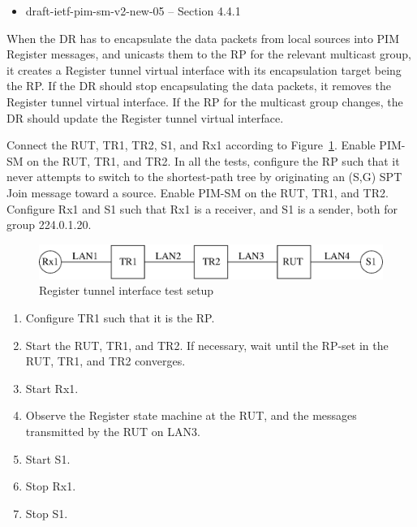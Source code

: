 \documentclass[11pt]{report}
\begin{document}
\begin{itemize}
  \item draft-ietf-pim-sm-v2-new-05 -- Section 4.4.1
\end{itemize}

When the DR has to encapsulate the data packets from local sources into
PIM Register messages, and unicasts them to the RP for the relevant multicast
group, it creates a Register tunnel virtual interface with its encapsulation
target being the RP. If the DR should stop encapsulating the data packets, it
removes the Register tunnel virtual interface. If the RP for the multicast
group changes, the DR should update the Register tunnel virtual interface.

Connect the RUT, TR1, TR2, S1, and Rx1 according to
Figure~\ref{fig:pim_test_3_2_register_tunnel_interface}.
Enable PIM-SM on the RUT, TR1,
and TR2. In all the tests, configure the RP such that it never attempts to
switch to the shortest-path tree by originating an (S,G) SPT Join message
toward a source. Enable PIM-SM on the RUT, TR1, and TR2.  Configure Rx1 and S1
such that Rx1 is a receiver, and S1 is a sender, both for group 224.0.1.20.


\begin{figure}[htbp]
  \begin{center}
    \includegraphics[scale=0.8]{figs/pim_test_3_2_register_tunnel_interface}
    \caption{Register tunnel interface test setup}
    \label{fig:pim_test_3_2_register_tunnel_interface}
  \end{center}
\end{figure}



\begin{enumerate}

  \item Configure TR1 such that it is the RP.

  \item Start the RUT, TR1, and TR2. If necessary, wait until the RP-set in
  the RUT, TR1, and TR2 converges.

  \item Start Rx1.

  \item Observe the Register state machine at the RUT, and the messages
  transmitted by the RUT on LAN3.

  \item Start S1.

  \item Stop Rx1.

  \item Stop S1.

\end{enumerate}
\end{document}
